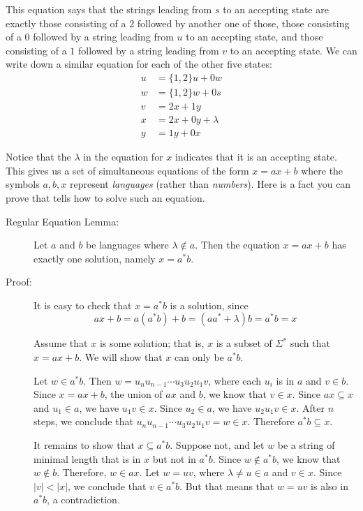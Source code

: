 \documentclass{article}
\begin{document}
This equation says that the strings leading from $s$ to an accepting state are exactly those consisting of a $2$ followed by another one of those, those consisting of a $0$ followed by a string leading from $u$ to an accepting state, and those consisting of a $1$ followed by a string leading from $v$ to an accepting state. We can write down a similar equation for each of the other five states:
\begin{align*}
u & = \{1,2\}u + 0w \\
w & = \{1,2\}w + 0s \\
v & = 2x + 1y \\
x & = 2x + 0y + \lambda \\
y & = 1y + 0x
\end{align*}

Notice that the $\lambda$ in the equation for $x$ indicates that it is an accepting state. This gives us a set of simultaneous equations of the form $x = ax+b$ where the symbols $a,b,x$ represent \emph{languages} (rather than \emph{numbers}). Here is a fact you can prove that tells how to solve such an equation.

\begin{description}
\item[Regular Equation Lemma:] Let $a$ and $b$ be languages where $\lambda \notin a$. Then the equation $x = ax+b$ has exactly one solution, namely $x = a^* b$.

\item[Proof:] It is easy to check that $x = a^*b$ is a solution, since
  \begin{equation*}
  ax+b = a(a^* b) + b = (aa^* + \lambda) b = a^* b = x
  \end{equation*}

  Assume that $x$ is some solution; that is, $x$ is a subset of $\Sigma^*$ such that $x = ax+b$. We will show that $x$ can only be $a^* b$.

  Let $w \in a^* b$. Then $w = u_n u_{n-1} \cdots u_3 u_2 u_1 v$, where each $u_i$ is in $a$ and $v \in b$. Since $x = ax+b$, the union of $ax$ and $b$, we know that $v \in x$. Since $ax \subseteq x$ and $u_1 \in a$, we have $u_1 v \in x$. Since $u_2 \in a$, we have $u_2 u_1 v \in x$. After $n$ steps, we conclude that $u_n u_{n-1} \cdots u_3 u_2 u_1 v = w \in x$. Therefore $a^* b \subseteq x$.

  It remains to show that $x \subseteq a^*b$. Suppose not, and let $w$ be a string of minimal length that is in $x$ but not in $a^* b$. Since $w \notin a^* b$, we know that $w \notin b$. Therefore, $w \in ax$. Let $w = uv$, where $\lambda \neq u \in a$ and $v \in x$. Since $|v| < |x|$, we conclude that $v \in a^* b$. But that means that $w = uv$ is also in $a^* b$, a contradiction.
\end{description}
\end{document}
